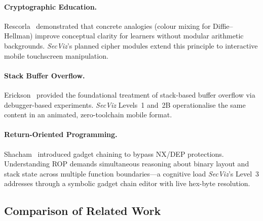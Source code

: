 \documentclass[12pt,a4paper]{article}
\newcommand{\SV}{\textit{SecViz}}
\begin{document}
\paragraph{Cryptographic Education.}
Rescorla~\cite{rescorla2018} demonstrated that concrete analogies (colour mixing
for Diffie--Hellman) improve conceptual clarity for learners without modular
arithmetic backgrounds. \SV{}'s planned cipher modules extend this principle to
interactive mobile touchscreen manipulation.

\paragraph{Stack Buffer Overflow.}
Erickson~\cite{erickson2008} provided the foundational treatment of stack-based
buffer overflow via debugger-based experiments. \SV{} Levels~1 and~2B
operationalise the same content in an animated, zero-toolchain mobile format.

\paragraph{Return-Oriented Programming.}
Shacham~\cite{shacham2007} introduced gadget chaining to bypass NX/DEP
protections. Understanding ROP demands simultaneous reasoning about binary layout
and stack state across multiple function boundaries---a cognitive load \SV{}'s
Level~3 addresses through a symbolic gadget chain editor with live hex-byte
resolution.

\subsection{Comparison of Related Work}
\end{document}
